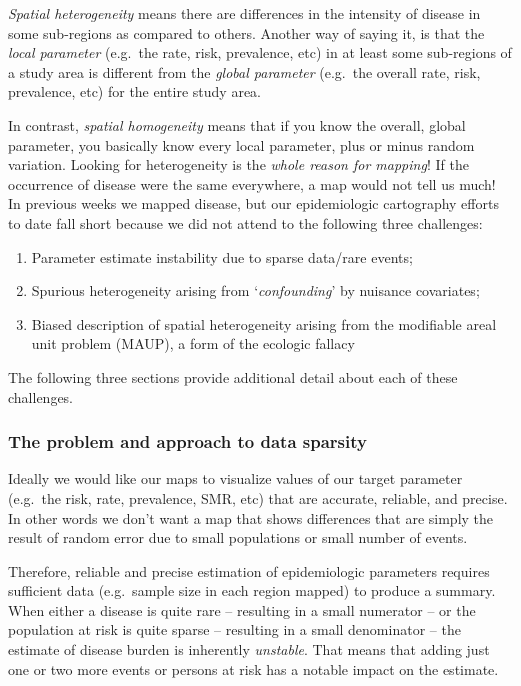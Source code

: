 \documentclass[
]{book}
\providecommand{\tightlist}{%
  \setlength{\itemsep}{0pt}\setlength{\parskip}{0pt}}
\begin{document}
\emph{Spatial heterogeneity} means there are differences in the intensity of disease in some sub-regions as compared to others. Another way of saying it, is that the \emph{local parameter} (e.g.~the rate, risk, prevalence, etc) in at least some sub-regions of a study area is different from the \emph{global parameter} (e.g.~the overall rate, risk, prevalence, etc) for the entire study area.

In contrast, \emph{spatial homogeneity} means that if you know the overall, global parameter, you basically know every local parameter, plus or minus random variation. Looking for heterogeneity is the \emph{whole reason for mapping}! If the occurrence of disease were the same everywhere, a map would not tell us much! In previous weeks we mapped disease, but our epidemiologic cartography efforts to date fall short because we did not attend to the following three challenges:

\begin{enumerate}
\def\labelenumi{\arabic{enumi}.}
\tightlist
\item
  Parameter estimate instability due to sparse data/rare events;
\item
  Spurious heterogeneity arising from `\emph{confounding}' by nuisance covariates;
\item
  Biased description of spatial heterogeneity arising from the modifiable areal unit problem (MAUP), a form of the ecologic fallacy
\end{enumerate}

The following three sections provide additional detail about each of these challenges.

\hypertarget{the-problem-and-approach-to-data-sparsity}{%
\subsubsection{The problem and approach to data sparsity}\label{the-problem-and-approach-to-data-sparsity}}

Ideally we would like our maps to visualize values of our target parameter (e.g.~the risk, rate, prevalence, SMR, etc) that are accurate, reliable, and precise. In other words we don't want a map that shows differences that are simply the result of random error due to small populations or small number of events.

Therefore, reliable and precise estimation of epidemiologic parameters requires sufficient data (e.g.~sample size in each region mapped) to produce a summary. When either a disease is quite rare -- resulting in a small numerator -- or the population at risk is quite sparse -- resulting in a small denominator -- the estimate of disease burden is inherently \emph{unstable}. That means that adding just one or two more events or persons at risk has a notable impact on the estimate.
\end{document}
